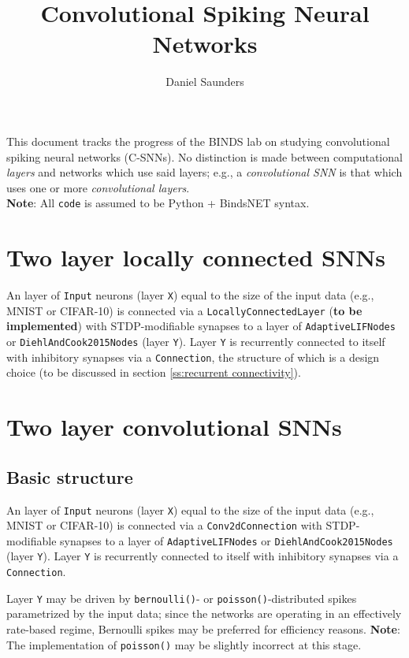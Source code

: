\documentclass{article}
\title{Convolutional Spiking Neural Networks}
\author{Daniel Saunders}
\begin{document}
\maketitle

This document tracks the progress of the BINDS lab on studying convolutional spiking neural networks (C-SNNs). No distinction is made between computational \textit{layers} and networks which use said layers; e.g., a \textit{convolutional SNN} is that which uses one or more \textit{convolutional layers}. \\

\textbf{Note}: All \texttt{code} is assumed to be Python + BindsNET syntax.

\section{Two layer locally connected SNNs}

An layer of \texttt{Input} neurons (layer \texttt{X}) equal to the size of the input data (e.g., MNIST or CIFAR-10) is connected via a \texttt{LocallyConnectedLayer} (\textbf{to be implemented}) with STDP-modifiable synapses to a layer of \texttt{AdaptiveLIFNodes} or \texttt{DiehlAndCook2015Nodes} (layer \texttt{Y}). Layer \texttt{Y} is recurrently connected to itself with inhibitory synapses via a \texttt{Connection}, the structure of which is a design choice (to be discussed in section \ref{ss:recurrent connectivity}).

\section{Two layer convolutional SNNs}

\subsection{Basic structure}

An layer of \texttt{Input} neurons (layer \texttt{X}) equal to the size of the input data (e.g., MNIST or CIFAR-10) is connected via a \texttt{Conv2dConnection} with STDP-modifiable synapses to a layer of \texttt{AdaptiveLIFNodes} or \texttt{DiehlAndCook2015Nodes} (layer \texttt{Y}). Layer \texttt{Y} is recurrently connected to itself with inhibitory synapses via a \texttt{Connection}.

Layer \texttt{Y} may be driven by \texttt{bernoulli()}- or \texttt{poisson()}-distributed spikes parametrized by the input data; since the networks are operating in an effectively rate-based regime, Bernoulli spikes may be preferred for efficiency reasons. \textbf{Note}: The implementation of \texttt{poisson()} may be slightly incorrect at this stage.
\end{document}
